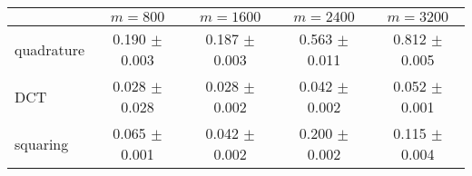 \centering
\renewcommand{\arraystretch}{1.2}
\begin{tabular}{@{}lcccc@{}}
\toprule
 & $m=800$ & $m=1600$ & $m=2400$ & $m=3200$\\
\midrule
quadrature & 0.190 $\pm$ 0.003 & 0.187 $\pm$ 0.003 & 0.563 $\pm$ 0.011 & 0.812 $\pm$ 0.005 \\
DCT & 0.028 $\pm$ 0.028 & 0.028 $\pm$ 0.002 & 0.042 $\pm$ 0.002 & 0.052 $\pm$ 0.001 \\
squaring & 0.065 $\pm$ 0.001 & 0.042 $\pm$ 0.002 & 0.200 $\pm$ 0.002 & 0.115 $\pm$ 0.004 \\
\bottomrule
\end{tabular}

